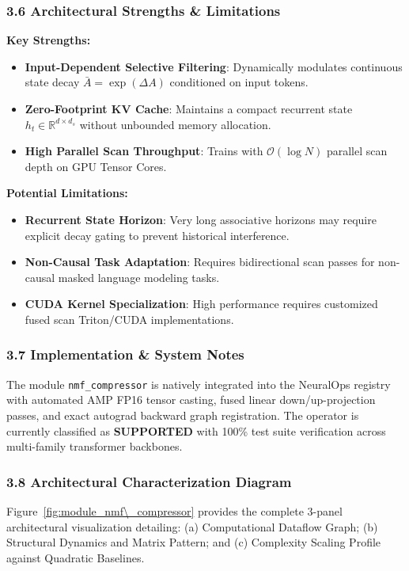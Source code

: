 \subsubsection*{3.6 Architectural Strengths \& Limitations}
\textbf{Key Strengths:}
\begin{itemize}
    \item \textbf{Input-Dependent Selective Filtering}: Dynamically modulates continuous state decay $\bar{A} = \exp(\Delta A)$ conditioned on input tokens.
    \item \textbf{Zero-Footprint KV Cache}: Maintains a compact recurrent state $h_t \in \mathbb{R}^{d \times d_s}$ without unbounded memory allocation.
    \item \textbf{High Parallel Scan Throughput}: Trains with $\mathcal{O}(\log N)$ parallel scan depth on GPU Tensor Cores.
\end{itemize}

\textbf{Potential Limitations:}
\begin{itemize}
    \item \textbf{Recurrent State Horizon}: Very long associative horizons may require explicit decay gating to prevent historical interference.
    \item \textbf{Non-Causal Task Adaptation}: Requires bidirectional scan passes for non-causal masked language modeling tasks.
    \item \textbf{CUDA Kernel Specialization}: High performance requires customized fused scan Triton/CUDA implementations.
\end{itemize}

\subsubsection*{3.7 Implementation \& System Notes}
The module \texttt{nmf\_compressor} is natively integrated into the NeuralOps registry with automated AMP FP16 tensor casting, fused linear down/up-projection passes, and exact autograd backward graph registration. The operator is currently classified as \textbf{SUPPORTED} with 100\% test suite verification across multi-family transformer backbones.

\subsubsection*{3.8 Architectural Characterization Diagram}
Figure~\ref{fig:module_nmf\_compressor} provides the complete 3-panel architectural visualization detailing: (a) Computational Dataflow Graph; (b) Structural Dynamics and Matrix Pattern; and (c) Complexity Scaling Profile against Quadratic Baselines.

